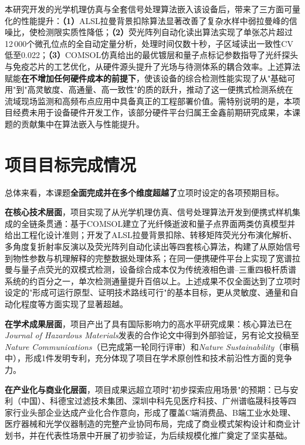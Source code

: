\documentclass[12pt,a4paper]{article}
\begin{document}
本研究开发的光学机理仿真与全套信号处理算法嵌入该设备后，带来了三方面可量化的性能提升：\textbf{（1）}ALSL拉曼背景扣除算法显著改善了复杂水样中弱拉曼峰的信噪比，使检测限实质性降低；\textbf{（2）}荧光阵列自动化读出算法实现了单张芯片超过12\,000个微孔位点的全自动定量分析，处理时间仅数十秒，子区域读出一致性CV低至0.022；\textbf{（3）}COMSOL仿真给出的最优镀层和量子点标记参数指导了光纤探头与免疫芯片的工艺优化，从硬件源头提升了光场与待测体系的耦合效率。上述算法赋能\textbf{在不增加任何硬件成本的前提下}，使该设备的综合检测性能实现了从"基础可用"到"高灵敏度、高通量、高一致性"的质的跃升，推动了这一便携式检测系统在流域现场监测和高频布点应用中具备真正的工程部署价值。需特别说明的是，本项目经费未用于设备硬件开发工作，该部分硬件平台归属王金鑫前期研究成果，本课题的贡献集中在算法嵌入与性能提升。

\section{项目目标完成情况}

总体来看，本课题\textbf{全面完成并在多个维度超越了}立项时设定的各项预期目标。

\textbf{在核心技术层面}，项目实现了从光学机理仿真、信号处理算法开发到便携式样机集成的全链条贯通：基于COMSOL建立了光纤倏逝波和量子点界面两类仿真模型并给出工程化设计准则；开发了ALSL拉曼背景扣除、转移矩阵荧光分布演化解析、多角度复折射率反演以及荧光阵列自动化读出等四套核心算法，构建了从原始信号到物性参数与机理解释的完整数据处理体系；在同一便携硬件平台上实现了宽谱拉曼与量子点荧光的双模式检测，设备综合成本仅为传统液相色谱--三重四极杆质谱系统的约百分之一，单次检测通量提升百倍以上。上述成果不仅全面达到了立项时设定的"形成可运行原型、证明技术路线可行"的基本目标，更从灵敏度、通量和自动化程度等方面实现了显著超越。

\textbf{在学术成果层面}，项目产出了具有国际影响力的高水平研究成果：核心算法已在\textit{Journal of Hazardous Materials}发表的合作论文中得到外部验证，另有论文投稿至\textit{Nature Communications}（已完成第一轮同行评审）和\textit{Nature Sustainability}（审稿中），形成1件发明专利，充分体现了项目在学术原创性和技术前沿性方面的竞争力。

\textbf{在产业化与商业化层面}，项目成果远超立项时"初步探索应用场景"的预期：已与安利（中国）、科德宝过滤技术集团、深圳中科先见医疗科技、广州谱临晟科技等四家行业头部企业达成产业化合作意向，形成了覆盖C端消费品、B端工业水处理、医疗器械和光学仪器制造的完整产业协同布局，完成了商业模式架构设计和商业计划书，并在代表性场景中开展了初步验证，为后续规模化推广奠定了坚实基础。
\end{document}
